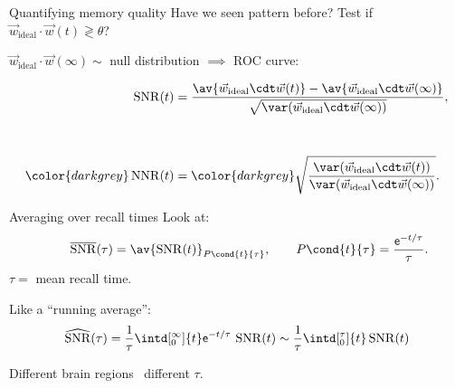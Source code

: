\documentclass{beamer}%
\newcommand{\inv}{^{-1}}
\newcommand{\syn}{\vec{w}}
\newcommand{\synid}{\syn_\text{ideal}}
\DeclareMathOperator{\SNR}{SNR}
\DeclareMathOperator{\snr}{SNR}
\newcommand{\snrb}{\overline{\snr}}
\renewcommand{\e}{\mathsf{e}}
\begin{document}
\begin{frame}{Quantifying memory quality}
%
 Have we seen pattern before?
 Test if $\synid \cdot \syn(t) \gtrless \theta$?

 $\synid \cdot \syn(\infty) \sim$  null distribution
 $\implies$ ROC curve:

 \vp
 \parbox[t]{0.4\linewidth}{%
 }
 \parbox[t]{0.55\linewidth}{%
 \vspace{-\baselineskip}
 \begin{equation*}
   \begin{aligned}
     \snr(t) &= \frac{ \av{\synid\cdt\syn(t)} - \av{\synid\cdt\syn(\infty)} }{ \sqrt{\var(\synid\cdt\syn(\infty))}}, \\[1cm]
    \color{darkgrey} \operatorname{NNR}(t) &= \color{darkgrey} \sqrt{\frac{ \var(\synid\cdt\syn(t)) }{ \var(\synid\cdt\syn(\infty)) }}.
   \end{aligned}
 \end{equation*}
 }

%
\end{frame}


\begin{frame}{Averaging over recall times}
%
 Look at:
 \begin{equation*}
   \qquad
   \snrb(\tau) = \av{\snr(t)}_{P\cond{t}{\tau}},
   \qquad
   P\cond{t}{\tau} = \frac{\e^{-t/\tau}}{\tau}.
 \end{equation*}
 $\tau=$ mean recall time.

 \vp Like a ``running average'':
 \begin{equation*}
   \widehat{\SNR}(\tau) = \frac{1}{\tau}\intd[_0^\infty]{t}\e^{-t/\tau}\,\SNR(t)
     \sim \frac{1}{\tau}\intd[_0^\tau]{t}\SNR(t)
 \end{equation*}

 \vp Different brain regions \lto\ different $\tau$.
%
\end{frame}

\end{document}
